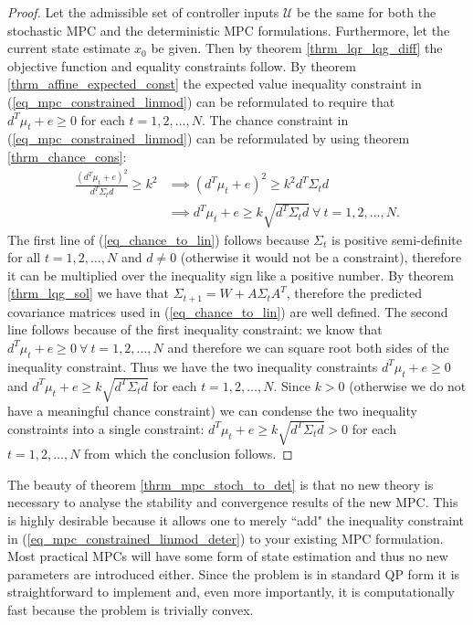 \begin{proof}
Let the admissible set of controller inputs $\mathcal{U}$ be the same for both the stochastic MPC and the deterministic MPC formulations. Furthermore, let the current state estimate $x_0$ be given. Then by theorem \ref{thrm_lqr_lqg_diff} the objective function and equality constraints follow. By theorem \ref{thrm_affine_expected_const} the expected value inequality constraint in (\ref{eq_mpc_constrained_linmod}) can be reformulated to require that $d^T\mu_t + e \geq 0$ for each $t=1, 2,\hdots, N$. The chance constraint in (\ref{eq_mpc_constrained_linmod})  can be reformulated by using theorem \ref{thrm_chance_cons}:
\begin{equation}
\begin{aligned}
\frac{(d^T\mu_t+e)^2}{d^T \Sigma_t d} \geq k^2 &\implies (d^T\mu_t+e)^2 \geq k^2 {d^T \Sigma_t d} \\
&\implies d^T\mu_t+e \geq k \sqrt{d^T \Sigma_t d}~\forall~t=1, 2,\hdots, N.
\end{aligned}
\label{eq_chance_to_lin}
\end{equation}
The first line of (\ref{eq_chance_to_lin}) follows because $\Sigma_t$ is positive semi-definite for all $t=1, 2,\hdots, N$ and $d \neq 0$ (otherwise it would not be a constraint), therefore it can be multiplied over the inequality sign like a positive number. By theorem \ref{thrm_lqg_sol} we have that $\Sigma_{t+1} = W + A\Sigma_tA^T$, therefore the predicted covariance matrices used in (\ref{eq_chance_to_lin}) are well defined. The second line follows because of the first inequality constraint: we know that $d^T\mu_t+e \geq 0 ~\forall~t=1,2,\hdots, N$ and therefore we can square root both sides of the inequality constraint. Thus we have the two inequality constraints $d^T\mu_t+e \geq 0$ and $d^T\mu_t+e \geq k \sqrt{d^T \Sigma_t d}$ for each $t=1,2,\hdots,N$. Since $k > 0$ (otherwise we do not have a meaningful chance constraint) we can condense the two inequality constraints into a single constraint: $d^T\mu_t+e \geq k \sqrt{d^T \Sigma_t d} > 0$ for each $t=1,2,\hdots,N$ from which the conclusion follows.  
\end{proof}
The beauty of theorem \ref{thrm_mpc_stoch_to_det} is that no new theory is necessary to analyse the stability and convergence results of the new MPC. This is highly desirable because it allows one to merely ``add" the inequality constraint in (\ref{eq_mpc_constrained_linmod_deter}) to your existing MPC formulation. Most practical MPCs will have some form of state estimation and thus no new parameters are introduced either. Since the problem is in standard QP form it is straightforward to implement and, even more importantly, it is computationally fast because the problem is trivially convex.

